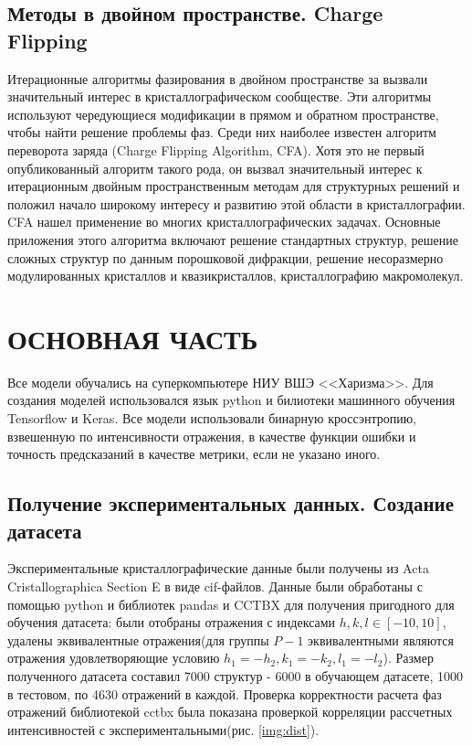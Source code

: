 \documentclass{article}
\begin{document}
\subsection{Методы в двойном пространстве. Charge Flipping}
Итерационные алгоритмы фазирования в двойном пространстве за вызвали значительный интерес в кристаллографическом сообществе. Эти алгоритмы используют чередующиеся модификации в прямом и обратном пространстве, чтобы найти решение проблемы фаз. Среди них наиболее известен алгоритм переворота заряда (Charge Flipping Algorithm, CFA)\cite{ChargeFlipping}. 
Хотя это не первый опубликованный алгоритм такого рода, он вызвал значительный интерес к итерационным двойным пространственным методам для структурных решений и положил начало широкому интересу и развитию этой области в кристаллографии.
CFA нашел применение во многих кристаллографических задачах. Основные приложения этого алгоритма включают решение стандартных структур, решение сложных структур по данным порошковой дифракции, решение несоразмерно модулированных кристаллов и квазикристаллов, кристаллографию макромолекул\cite{Palatinus2013}.

\newpage
\section{ОСНОВНАЯ ЧАСТЬ}
Все модели обучались на суперкомпьютере НИУ ВШЭ <<Харизма>>. Для создания моделей использовался язык python и билиотеки машинного обучения Tensorflow и Keras. Все модели использовали бинарную кроссэнтропию, взвешенную по интенсивности отражения, в качестве функции ошибки и точность предсказаний в качестве метрики, если не указано иного.
  
\subsection{Получение экспериментальных данных. Создание датасета}

Экспериментальные кристаллографические данные были получены из Acta Cristallographica Section E в виде cif-файлов. Данные были обработаны с помощью python и библиотек pandas и CCTBX для получения пригодного для обучения датасета: были отобраны отражения с индексами $h,k,l \in [-10, 10]$, удалены эквивалентные отражения(для группы $P-1$ эквивалентными являются отражения удовлетворяющие условию $h_1=-h_2, k_1=-k_2, l_1=-l_2$). Размер полученного датасета составил 7000 структур - 6000 в обучающем датасете, 1000 в тестовом, по 4630 отражений в каждой. Проверка корректности расчета фаз отражений библиотекой cctbx была показана проверкой корреляции рассчетных интенсивностей с экспериментальными(рис. \ref{img:dist}). 
\end{document}
